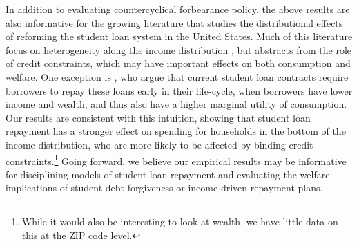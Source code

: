 \documentclass[12pt]{article}
\begin{document}
In addition to evaluating countercyclical forbearance policy, the above results are also informative for the growing literature that studies the distributional effects of reforming the student loan system in the United States. Much of this literature focus on heterogeneity along the income distribution \citep[see e.g.][]{catherine2023distributional}, but abstracts from the role of credit constraints, which may have important effects on both consumption and welfare. %
One exception is \cite{boutros_borrow_2022}, who argue that current student loan contracts require borrowers to repay these loans early in their life-cycle, when borrowers have lower income and wealth, and thus also have a higher marginal utility of consumption. 
Our results are consistent with this intuition, showing that student loan repayment has a stronger effect on spending for households in the bottom of the income distribution, who are more likely to be affected by binding credit constraints.\footnote{While it would also be interesting to look at wealth, we have little data on this at the ZIP code level.} Going forward, we believe our empirical results may be informative for disciplining models of student loan repayment and evaluating the welfare implications of student debt forgiveness or income driven repayment plans. 



\clearpage 
\end{document}
